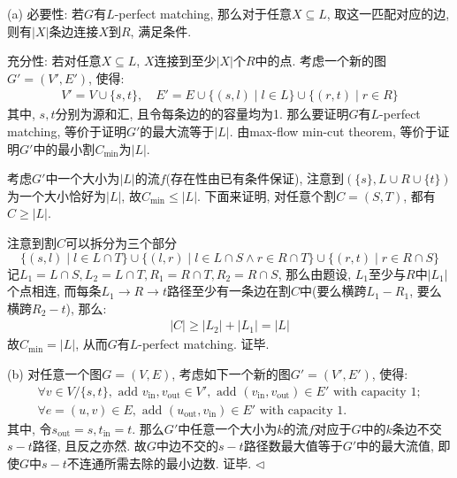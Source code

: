 \documentclass[11pt]{article}
\newenvironment{answer}[1][Answer]{\begin{trivlist}
\item[\hskip \labelsep{\bfseries\itshape#1.}\hskip \labelsep]}{\hfill$\lhd$\end{trivlist}}
\begin{document}
\begin{answer}
    (a) 必要性: 若$G$有$L$-perfect matching, 那么对于任意$X \subseteq L$, 取这一匹配对应的边, 则有$|X|$条边连接$X$到$R$, 满足条件.

    充分性: 若对任意$X\subseteq L$, $X$连接到至少$|X|$个$R$中的点. 考虑一个新的图$G' = (V',E')$, 使得:
    \begin{align*}
        V' = V \cup \{s, t\}, \quad E' = E \cup \{(s, l) \mid l \in L\} \cup \{(r, t) \mid r \in R\}
    \end{align*}
    其中, $s,t$分别为源和汇, 且令每条边的的容量均为1. 那么要证明$G$有$L$-perfect matching, 等价于证明$G'$的最大流等于$|L|$. 由max-flow min-cut theorem, 等价于证明$G'$中的最小割$C_{\min}$为$|L|$.

    考虑$G'$中一个大小为$|L|$的流$f$(存在性由已有条件保证), 注意到$(\{s\}, L\cup R\cup\{t\})$为一个大小恰好为$|L|$, 故$C_{\min} \le |L|$. 下面来证明, 对任意个割$C = (S,T)$, 都有$C \ge |L|$. 

    注意到割$C$可以拆分为三个部分
    \[
    \{(s,l)\mid l \in L\cap T\} \cup \{(l,r)\mid l\in L\cap S\land r\in R\cap T \} \cup \{(r,t)\mid r\in R\cap S\}
    \]
    记$L_1 = L \cap S, L_2 = L\cap T, R_1 = R\cap T, R_2 = R\cap S$, 那么由题设, $L_1$至少与$R$中$|L_1|$个点相连, 而每条$L_1 \rightarrow R \rightarrow t$路径至少有一条边在割$C$中(要么横跨$L_1-R_1$, 要么横跨$R_2 - t$), 那么:
    \begin{align*}
        |C| \ge |L_2| + |L_1| = |L|
    \end{align*} 
    故$C_{\min} = |L|$, 从而$G$有$L$-perfect matching. 证毕.

    (b) 对任意一个图$G = (V,E)$, 考虑如下一个新的图$G' = (V', E')$, 使得:
    \begin{align*}
        \forall v \in V/\{s,t\}, \text{ add } v_{\text{in}}, v_{\text{out}} \in V', \text{ add } (v_{\text{in}}, v_{\text{out}}) \in E' \text{ with capacity } 1; \\
        \forall e = (u,v) \in E, \text{ add } (u_{\text{out}}, v_{\text{in}}) \in E' \text{ with capacity } 1.
    \end{align*}
    其中, 令$s_{\text{out}} = s, t_{\text{in}} = t$. 那么$G'$中任意一个大小为$k$的流$f$对应于$G$中的$k$条边不交$s-t$路径, 且反之亦然. 故$G$中边不交的$s-t$路径数最大值等于$G'$中的最大流值, 即使$G$中$s-t$不连通所需去除的最小边数. 证毕.
\end{answer}
\end{document}
